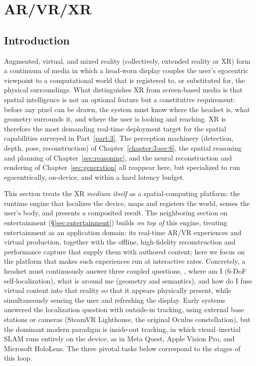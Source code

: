 
\section{AR/VR/XR}
\label{sec:p4_s10_1}

\subsection{Introduction}
\label{subsec:p4-sec10-1-introduction}

Augmented, virtual, and mixed reality (collectively, extended reality or XR) form a continuum of media in which a head-worn display couples the user's egocentric viewpoint to a computational world that is registered to, or substituted for, the physical surroundings. 
What distinguishes XR from screen-based media is that spatial intelligence is not an optional feature but a constitutive requirement: before any pixel can be drawn, the system must know where the headset is, what geometry surrounds it, and where the user is looking and reaching. 
XR is therefore the most demanding real-time deployment target for the spatial capabilities surveyed in Part~\ref{part:3}. 
The perception machinery (detection, depth, pose, reconstruction) of Chapter~\ref{chapter:3:sec:6}, the spatial reasoning and planning of Chapter~\ref{sec:reasoning}, and the neural reconstruction and rendering of Chapter~\ref{sec:generation} all reappear here, but specialized to run egocentrically, on-device, and within a hard latency budget.

This section treats the XR \emph{medium itself} as a spatial-computing platform: the runtime engine that localizes the device, maps and registers the world, senses the user's body, and presents a composited result. 
The neighboring section on entertainment (§\ref{sec:entertainment}) builds \emph{on top of} this engine, treating entertainment as an application domain: its real-time AR/VR experiences and virtual production, together with the offline, high-fidelity reconstruction and performance capture that supply them with authored content; here we focus on the platform that makes such experiences run at interactive rates.
Concretely, a headset must continuously answer three coupled questions, \ie, where am I (6-DoF self-localization), what is around me (geometry and semantics), and how do I fuse virtual content into that reality so that it appears physically present, while simultaneously sensing the user and refreshing the display. 
Early systems answered the localization question with outside-in tracking, using external base stations or cameras (SteamVR Lighthouse, the original Oculus constellation), but the dominant modern paradigm is inside-out tracking, in which visual--inertial SLAM runs entirely on the device, as in Meta Quest, Apple Vision Pro, and Microsoft HoloLens. 
The three pivotal tasks below correspond to the stages of this loop.


